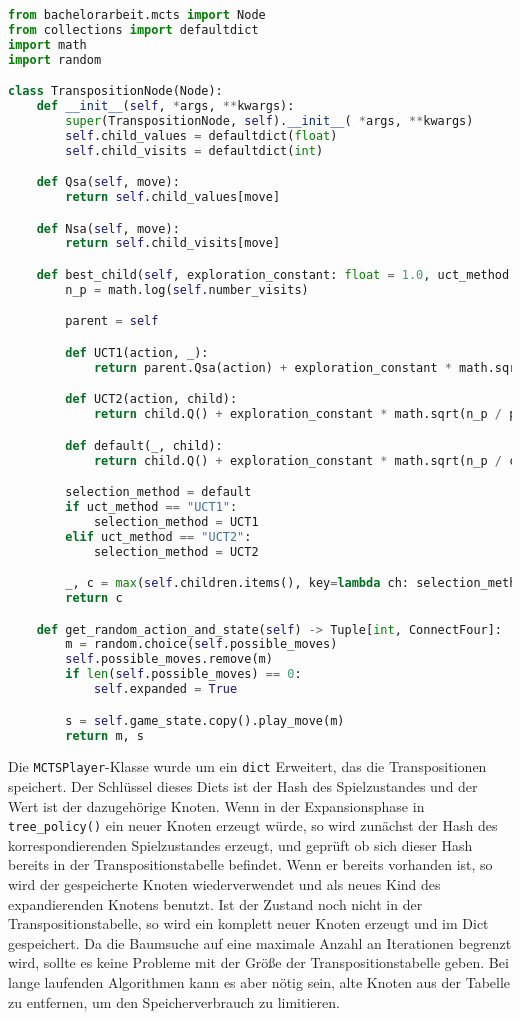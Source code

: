 \begin{lstlisting}[language=Python,label={lst:transpos-node}]
from bachelorarbeit.mcts import Node
from collections import defaultdict
import math
import random

class TranspositionNode(Node):
    def __init__(self, *args, **kwargs):
        super(TranspositionNode, self).__init__( *args, **kwargs)
        self.child_values = defaultdict(float)
        self.child_visits = defaultdict(int)

    def Qsa(self, move):
        return self.child_values[move]

    def Nsa(self, move):
        return self.child_visits[move]

    def best_child(self, exploration_constant: float = 1.0, uct_method: str = "UCT") -> "Node":
        n_p = math.log(self.number_visits)

        parent = self

        def UCT1(action, _):
            return parent.Qsa(action) + exploration_constant * math.sqrt(n_p / parent.Nsa(action))

        def UCT2(action, child):
            return child.Q() + exploration_constant * math.sqrt(n_p / parent.Nsa(action))

        def default(_, child):
            return child.Q() + exploration_constant * math.sqrt(n_p / child.number_visits)

        selection_method = default
        if uct_method == "UCT1":
            selection_method = UCT1
        elif uct_method == "UCT2":
            selection_method = UCT2

        _, c = max(self.children.items(), key=lambda ch: selection_method(*ch))
        return c

    def get_random_action_and_state(self) -> Tuple[int, ConnectFour]:
        m = random.choice(self.possible_moves)
        self.possible_moves.remove(m)
        if len(self.possible_moves) == 0:
            self.expanded = True

        s = self.game_state.copy().play_move(m)
        return m, s
\end{lstlisting}

Die \verb|MCTSPlayer|-Klasse wurde um ein \verb|dict| Erweitert, das die Transpositionen speichert.
Der Schlüssel dieses Dicts ist der Hash des Spielzustandes und der Wert ist der dazugehörige Knoten.
Wenn in der Expansionsphase in \verb|tree_policy()| ein neuer Knoten erzeugt würde, so wird zunächst der Hash des korrespondierenden Spielzustandes erzeugt, und geprüft ob sich dieser Hash bereits in der Transpositionstabelle befindet.
Wenn er bereits vorhanden ist, so wird der gespeicherte Knoten wiederverwendet und als neues Kind des expandierenden Knotens benutzt.
Ist der Zustand noch nicht in der Transpositionstabelle, so wird ein komplett neuer Knoten erzeugt und im Dict gespeichert.
Da die Baumsuche auf eine maximale Anzahl an Iterationen begrenzt wird, sollte es keine Probleme mit der Größe der Transpositionstabelle geben.
Bei lange laufenden Algorithmen kann es aber nötig sein, alte Knoten aus der Tabelle zu entfernen, um den Speicherverbrauch zu limitieren.

